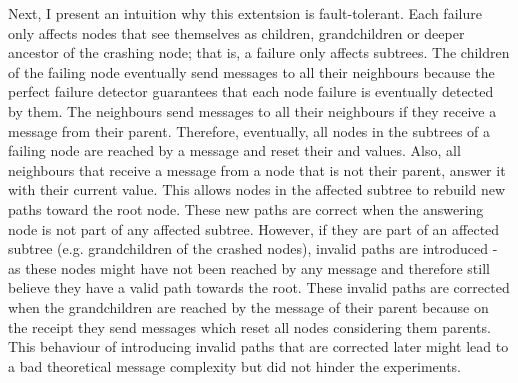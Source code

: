 Next, I present an intuition why this extentsion is fault-tolerant.
Each failure only affects nodes that see themselves as children, grandchildren or deeper ancestor of the crashing node; that is, a failure only affects subtrees.
The children of the failing node eventually send  messages to all their neighbours because the perfect failure detector guarantees that each node failure is eventually detected by them.
The neighbours send  messages to all their neighbours if they receive a  message from their parent. 
Therefore, eventually, all nodes in the subtrees of a failing node are reached by a  message and reset their  and  values.
Also, all neighbours that receive a  message from a node that is not their parent, answer it with their current  value.
This allows nodes in the affected subtree to rebuild new paths toward the root node.
These new paths are correct when the answering node is not part of any affected subtree.
However, if they are part of an affected subtree (e.g. grandchildren of the crashed nodes), invalid paths are introduced - as these nodes might have not been reached by any  message and therefore still believe they have a valid path towards the root.
These invalid paths are corrected when the grandchildren are reached by the  message of their parent because on the receipt they send  messages which reset all nodes considering them parents. 
This behaviour of introducing invalid paths that are corrected later might lead to a bad theoretical message complexity but did not hinder the experiments.

